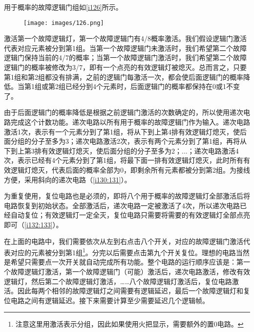 用于概率的故障逻辑门组如\autoref{i126}所示。

\begin{figure}[!ht]
\centering
\texttt{[image: images/126.png]}
\caption{}
\label{i126}
\end{figure}

激活第一个故障逻辑灯，第一个故障逻辑门有4/8概率激活。我们假设逻辑门激活代表对应元素被分到第1组。当第一个故障逻辑门未激活时，我们希望第二个故障逻辑门保持当前的4/7的概率；当第一个故障逻辑门激活时，我们希望第二个故障逻辑门的概率被修改为3/7，即有一个点亮的有效逻辑灯被熄灭。总而言之，只要第1组和第2组都没有排满，之前的逻辑门每激活一次，都会使后面逻辑门的概率降低。当第1组或第2组已经分到4个元素时，后面逻辑门的概率都保持在0或1不变了。

由于后面逻辑门的概率降低是根据之前逻辑门激活的次数确定的，所以使用递次电路完成这个计数功能。递次电路以所有用于概率的故障逻辑门作为输入。递次电路激活1次，表示有一个元素分到了第1组，将从下到上第4排有效逻辑灯熄灭，使后面分组的分子至多为3；递次电路激活2次，表示有两个元素分到了第1组，再将从下到上第3排有效逻辑灯熄灭，使后面分组的分子至多为2；...；递次电路激活4次，表示已经有4个元素分到了第1组，将最下面一排有效逻辑灯熄灭，此时所有有效逻辑灯熄灭，代表后面的概率全部为0，即剩余所有元素都被分到第2组。为接线方便，采用斜向的递次电路（\autoref{i130:131}）。

\begin{figure}[!ht]
\begin{center}
\qquad
{}
\end{center}
\caption{}
\label{i130:131}
\end{figure}

为重复使用，复位电路也是必须的，即将八个用于概率的故障逻辑灯全部激活后将电路恢复到初始状态。全部激活后，递次电路一定被激活了4次，所以递次电路已经自动复位；有效逻辑灯一定全灭，复位电路只需要将需要的有效逻辑灯全部点亮即可（\autoref{i132:133}）。

\begin{figure}[!ht]
\begin{center}
\qquad
{}
\end{center}
\caption{}
\label{i132:133}
\end{figure}

在上面的电路中，我们需要依次从左到右点击八个开关，对应的故障逻辑门激活代表对应的元素被分到第1组\footnote{注意这里用激活表示分组，因此如果使用火把显示，需要额外的置0电路。}。分完以后需要点击第九个开关复位。理想的电路当然是希望只需要点一次开关就自动完成所有功能。整个电路的运行顺序应该是：第一个故障逻辑灯激活，第一个故障逻辑门（可能）激活后，递次电路激活，修改有效逻辑灯，然后第二个故障逻辑灯激活，……八个故障逻辑灯激活后，复位电路激活。因此每两个相邻的故障逻辑灯之间需要有逻辑延迟，最后一个故障逻辑灯和复位电路之间有逻辑延迟。接下来需要计算至少需要延迟几个逻辑帧。


